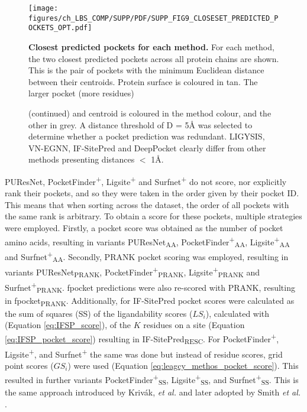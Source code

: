 \begin{figure}[ht!]
    \centering
    \texttt{[image: figures/ch\_LBS\_COMP/SUPP/PDF/SUPP\_FIG9\_CLOSESET\_PREDICTED\_POCKETS\_OPT.pdf]}
    \caption[Closest predicted pockets for each methods]{\textbf{Closest predicted pockets for each method.} For each method, the two closest predicted pockets across all protein chains are shown. This is the pair of pockets with the minimum Euclidean distance between their centroids. Protein surface is coloured in tan. The larger pocket (more residues)}
    \label{fig:closest_pred_pockets}
\end{figure}

\begin{figure}[ht!]
\ContinuedFloat
\caption*{(continued)  and centroid is coloured in the method colour, and the other in grey. A distance threshold of D = 5\AA{} was selected to determine whether a pocket prediction was redundant. LIGYSIS, VN-EGNN, IF-SitePred and DeepPocket clearly differ from other methods presenting distances $<$ 1\AA{}.}
\end{figure}

PUResNet, PocketFinder\textsuperscript{+}, Ligsite\textsuperscript{+} and Surfnet\textsuperscript{+} do not score, nor explicitly rank their pockets, and so they were taken in the order given by their pocket ID. This means that when sorting across the dataset, the order of all pockets with the same rank is arbitrary. To obtain a score for these pockets, multiple strategies were employed. Firstly, a pocket score was obtained as the number of pocket amino acids, resulting in variants PUResNet\textsubscript{AA}, PocketFinder\textsuperscript{+}\textsubscript{AA}, Ligsite\textsuperscript{+}\textsubscript{AA} and Surfnet\textsuperscript{+}\textsubscript{AA}. Secondly, PRANK pocket scoring was employed, resulting in variants PUResNet\textsubscript{PRANK}, PocketFinder\textsuperscript{+}\textsubscript{PRANK}, Ligsite\textsuperscript{+}\textsubscript{PRANK} and Surfnet\textsuperscript{+}\textsubscript{PRANK}. fpocket predictions were also re-scored with PRANK, resulting in fpocket\textsubscript{PRANK}. Additionally, for IF-SitePred pocket scores were calculated as the sum of squares (SS) of the ligandability scores ($LS_{i}$), calculated with (Equation \ref{eq:IFSP_score}), of the $K$ residues on a site (Equation \ref{eq:IFSP_pocket_score}) resulting in IF-SitePred\textsubscript{RESC}. For PocketFinder\textsuperscript{+}, Ligsite\textsuperscript{+}, and Surfnet\textsuperscript{+} the same was done but instead of residue scores, grid point scores ($GS_{i}$) were used (Equation \ref{eq:leagcy_methos_pocket_score}). This resulted in further variants PocketFinder\textsuperscript{+}\textsubscript{SS}, Ligsite\textsuperscript{+}\textsubscript{SS}, and Surfnet\textsuperscript{+}\textsubscript{SS}. This is the same approach introduced by Krivák, \textit{et al.} \cite{KRIVAK_2015_P2RANK} and later adopted by Smith \textit{et al.} \cite{SMITH_2024_GrASP}.

